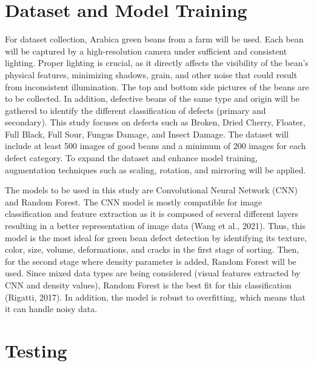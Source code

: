 \section{Dataset and Model Training}
For dataset collection, Arabica green beans from a farm will be used. Each bean will be captured by a high-resolution camera under sufficient and consistent lighting. Proper lighting is crucial, as it directly affects the visibility of the bean’s physical features, minimizing shadows, grain, and other noise that could result from inconsistent illumination. The top and bottom side pictures of the beans are to be collected. In addition, defective beans of the same type and origin will be gathered to identify the different classification of defects (primary and secondary). This study focuses on defects such as Broken, Dried Cherry, Floater, Full Black, Full Sour, Fungus Damage, and Insect Damage. The dataset will include at least 500 images of good beans and a minimum of 200 images for each defect category. To expand the dataset and enhance model training, augmentation techniques such as scaling, rotation, and mirroring will be applied.

The models to be used in this study are Convolutional Neural Network (CNN) and Random Forest. The CNN model is mostly compatible for image classification and feature extraction as it is composed of several different layers resulting in a better representation of image data (Wang et al., 2021). Thus, this model is the most ideal for green bean defect detection by identifying its texture, color, size, volume, deformations, and cracks in the first stage of sorting. Then, for the second stage where density parameter is added, Random Forest will be used. Since mixed data types are being considered (visual features extracted by CNN and density values), Random Forest is the best fit for this classification (Rigatti, 2017). In addition, the model is robust to overfitting, which means that it can handle noisy data. 

\section{Testing}
\label{sec:testing_and_evaluation}

